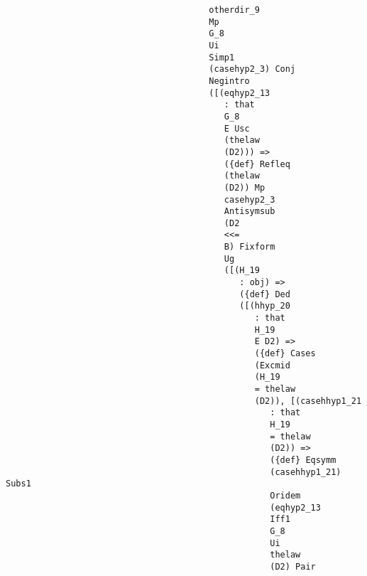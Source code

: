 \documentclass[12pt]{article}
\begin{document}
\begin{verbatim}
                                        otherdir_9 
                                        Mp 
                                        G_8 
                                        Ui 
                                        Simp1 
                                        (casehyp2_3) Conj 
                                        Negintro 
                                        ([(eqhyp2_13 
                                           : that 
                                           G_8 
                                           E Usc 
                                           (thelaw 
                                           (D2))) => 
                                           ({def} Refleq 
                                           (thelaw 
                                           (D2)) Mp 
                                           casehyp2_3 
                                           Antisymsub 
                                           (D2 
                                           <<= 
                                           B) Fixform 
                                           Ug 
                                           ([(H_19 
                                              : obj) => 
                                              ({def} Ded 
                                              ([(hhyp_20 
                                                 : that 
                                                 H_19 
                                                 E D2) => 
                                                 ({def} Cases 
                                                 (Excmid 
                                                 (H_19 
                                                 = thelaw 
                                                 (D2)), [(casehhyp1_21 
                                                    : that 
                                                    H_19 
                                                    = thelaw 
                                                    (D2)) => 
                                                    ({def} Eqsymm 
                                                    (casehhyp1_21) Subs1 
                                                    Oridem 
                                                    (eqhyp2_13 
                                                    Iff1 
                                                    G_8 
                                                    Ui 
                                                    thelaw 
                                                    (D2) Pair 

\end{verbatim}
\end{document}
